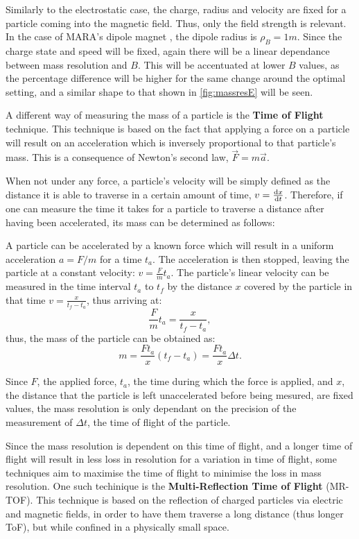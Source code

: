 Similarly to the electrostatic case, the charge, radius and velocity are fixed for a particle coming into the magnetic field. Thus, only the field strength is relevant. In the case of MARA's dipole magnet \cite{saren}, the dipole radius is $\rho_B = 1\unit{m}$. Since the charge state and speed will be fixed, again there will be a linear dependance between mass resolution and $B$. This will be accentuated at lower $B$ values, as the percentage difference will be higher for the same change around the optimal setting, and a similar shape to that shown in \autoref{fig:massresE} will be seen.

A different way of measuring the mass of a particle is the \textbf{Time of Flight} technique. This technique is based on the fact that applying a force on a particle will result on an acceleration which is inversely proportional to that particle's mass. This is a consequence of Newton's second law, $\vec F = m \vec a$. 

When not under any force, a particle's velocity will be simply defined as the distance it is able to traverse in a certain amount of time, $v = \frac{\text{d} x}{\text{d} t}$. Therefore, if one can measure the time it takes for a particle to traverse a distance after having been accelerated, its mass can be determined as follows:

A particle can be accelerated by a known force which will result in a uniform acceleration $a = F/m$ for a time $t_a$. The acceleration is then stopped, leaving the particle at a constant velocity: $v = \frac{F}{m}t_a$. The particle's linear velocity can be measured in the time interval $t_a$ to $t_f$ by the distance $x$ covered by the particle in that time $v = \frac{x}{t_f - t_a}$, thus arriving at:
\begin{equation*}
    \frac{F}{m} t_a  = \frac{x}{t_f-t_a},
\end{equation*}
thus, the mass of the particle can be obtained as: 
\begin{equation}
    \label{eq:tof}
    m = \frac{Ft_a}{x} (t_f-t_a) = \frac{Ft_a}{x} \Delta t.
\end{equation}

Since $F$, the applied force, $t_a$, the time during which the force is applied, and $x$, the distance that the particle is left unaccelerated before being mesured, are fixed values, the mass resolution is only dependant on the precision of the measurement of $\Delta t$, the time of flight of the particle. 

Since the mass resolution is dependent on this time of flight, and a longer time of flight will result in less loss in resolution for a variation in time of flight, some techniques aim to maximise the time of flight to minimise the loss in mass resolution. One such techinique is the \textbf{Multi-Reflection Time of Flight} (MR-TOF). This technique is based on the reflection of charged particles via electric and magnetic fields, in order to have them traverse a long distance (thus longer ToF), but while confined in a physically small space.

